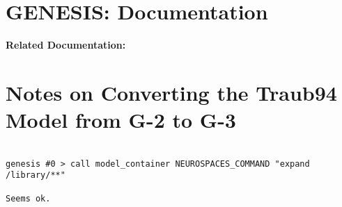 \documentclass[12pt]{article}
\begin{document}
\section*{GENESIS: Documentation}

{\bf Related Documentation:}

\section*{Notes on Converting the Traub94 Model from G-2 to G-3}

\begin{verbatim}

genesis #0 > call model_container NEUROSPACES_COMMAND "expand /library/**"

Seems ok.


\end{verbatim}
\end{document}

